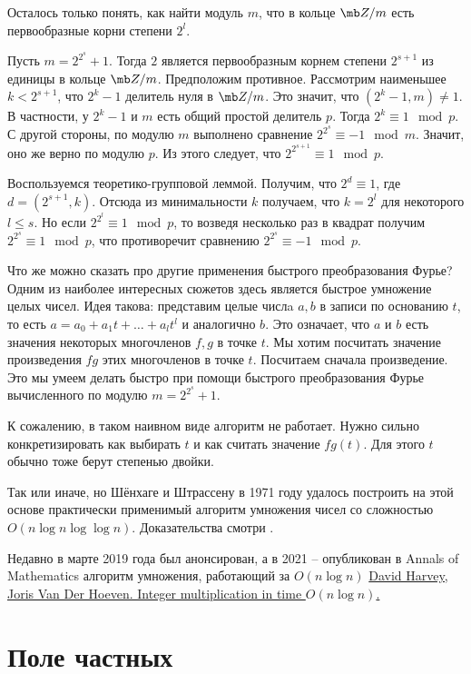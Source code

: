 Осталось только понять, как найти модуль $m$, что в кольце $\mb Z/m$ есть первообразные корни степени $2^l$.


\utv Пусть $m=2^{2^s}+1$. Тогда $2$ является первообразным корнем степени $2^{s+1}$ из единицы в кольце $\mb Z/m$. 
\eutv
\proof Предположим противное. Рассмотрим наименьшее $k<2^{s+1}$, что $2^k-1$ делитель нуля в $\mb Z/m$. Это значит, что $(2^k-1,m)\neq 1$. В частности, у $2^k-1$ и $m$ есть общий простой делитель $p$. Тогда $2^k\equiv 1 \mod p$. С другой стороны, по модулю $m$ выполнено сравнение $2^{2^s}\equiv -1 \mod m$. Значит, оно же верно по модулю $p$. Из этого следует, что $2^{2^{s+1}}\equiv 1 \mod p$.

Воспользуемся теоретико-групповой леммой. Получим, что $2^d\equiv 1$, где $d=(2^{s+1},k)$. Отсюда из минимальности $k$ получаем, что $k=2^l$ для некоторого $l\leq s$. Но если $2^{2^l} \equiv 1 \mod p$, то возведя несколько раз в квадрат получим $2^{2^s}\equiv 1 \mod p$, что противоречит сравнению $2^{2^s}\equiv -1\mod p$.   
\endproof

Что же можно сказать про другие применения быстрого преобразования Фурье? Одним из наиболее интересных сюжетов здесь является быстрое умножение целых чисел. Идея такова: представим целые  числa  $a,b$ в записи по основанию $t$, то есть $a=a_0+a_1t+\dots+a_lt^l$ и аналогично $b$. Это означает, что $a$ и $b$ есть значения некоторых многочленов $f,g$ в точке $t$. Мы хотим посчитать значение  произведения $fg$ этих многочленов в точке $t$. Посчитаем сначала произведение. Это мы умеем делать быстро при помощи быстрого преобразования Фурье вычисленного по модулю $m=2^{2^s}+1$. 

К сожалению, в таком наивном виде алгоритм не работает. Нужно сильно конкретизировать как выбирать $t$ и как считать значение $fg(t)$. Для этого $t$ обычно тоже берут степенью двойки.

Так или иначе, но Шёнхаге и Штрассену в 1971 году удалось построить на этой основе практически применимый алгоритм умножения чисел со сложностью $O(n\log n \log\log n)$. Доказательства смотри \cite[стр. 270]{AHU}.


Недавно в марте 2019 года был анонсирован, а в 2021 -- опубликован в Annals of Mathematics алгоритм умножения, работающий за $O(n\log n)$ \href{https://hal.archives-ouvertes.fr/hal-02070778/document}{David Harvey, Joris Van Der Hoeven. Integer multiplication in time $O(n \log n)$.}




\section{Поле частных}

